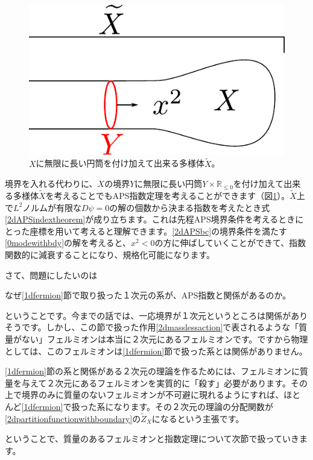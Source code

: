 \documentclass[paper=a4, fontsize=12pt, line_length=16cm, number_of_lines=33,dvipdfmx]{jlreq}
\numberwithin{equation}{section}
\newcommand{\Rb}{\mathbb{R}}
\newcommand{\Zt}{\widetilde{Z}}
\newenvironment{myquote}{\begin{tcolorbox}[
  colback = blue!5, after = \noindent] }{\end{tcolorbox}}
\begin{document}
\begin{figure}[htbp]
  \centering
  \includegraphics{APSbdyinfinite.pdf}
  \caption{$X$に無限に長い円筒を付け加えて出来る多様体$\widetilde{X}$。}
  \label{fig:APSbdyinfinite}
\end{figure}
境界を入れる代わりに、$X$の境界$Y$に無限に長い円筒$Y\times \Rb_{\le 0}$を付け加えて出来る多様体$\widetilde{X}$を考えることでもAPS指数定理を考えることができます（図\ref{fig:APSbdyinfinite}）。$\widetilde{X}$上で$L^2$ノルムが有限な$D\psi=0$の解の個数から決まる指数を考えたとき式\eqref{2dAPSindextheorem}が成り立ちます。これは先程APS境界条件を考えるときにとった座標を用いて考えると理解できます。\eqref{2dAPSbc}の境界条件を満たす\eqref{0modewithbdy}の解を考えると、$x^{2}<0$の方に伸ばしていくことができて、指数関数的に減衰することになり、規格化可能になります。

さて、問題にしたいのは
\begin{myquote}
  なぜ\ref{1dfermion}節で取り扱った１次元の系が、APS指数と関係があるのか。
\end{myquote}
ということです。今までの話では、一応境界が１次元というところは関係がありそうです。しかし、この節で扱った作用\eqref{2dmasslessaction}で表されるような「質量がない」フェルミオンは本当に２次元にあるフェルミオンです。ですから物理としては、このフェルミオンは\ref{1dfermion}節で扱った系とは関係がありません。

\ref{1dfermion}節の系と関係がある２次元の理論を作るためには、フェルミオンに質量を与えて２次元にあるフェルミオンを実質的に「殺す」必要があります。その上で境界のみに質量のないフェルミオンが不可避に現れるようにすれば、ほとんど\ref{1dfermion}で扱った系になります。その２次元の理論の分配関数が\eqref{2dpartitionfunctionwithboundary}の$\Zt_X$になるという主張です。

ということで、質量のあるフェルミオンと指数定理について次節で扱っていきます。
\end{document}
